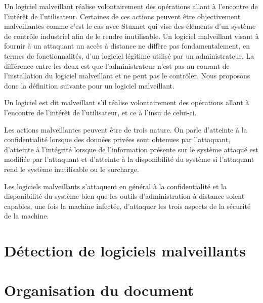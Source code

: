 
Un logiciel malveillant réalise volontairement des opérations allant à l'encontre de l'intérêt de l'utilisateur. 
Certaines de ces actions peuvent être objectivement malveillantes comme c'est le cas avec Stuxnet qui vise des éléments d'un système de contrôle industriel afin de le rendre inutilisable. 
Un logiciel malveillant visant à fournir à un attaquant un accès à distance ne diffère pas fondamentalement, en termes de fonctionnalités, d'un logiciel légitime utilisé par un administrateur.
La différence entre les deux est que l'administrateur n'est pas au courant de l'installation du logiciel malveillant et ne peut pas le contrôler.
Nous proposons donc la définition suivante pour un logiciel malveillant.
\begin{defi}
Un logiciel est dit malveillant s'il réalise volontairement des opérations allant à l'encontre de l'intérêt de l'utilisateur, et ce à l'insu de celui-ci.
\end{defi}

Les actions malveillantes peuvent être de trois nature. On parle d'atteinte à la confidentialité lorsque des données privées sont obtenues par l'attaquant, d'atteinte à l'intégrité lorsque de l'information présente sur le système attaqué est modifiée par l'attaquant et d'atteinte à la disponibilité du système si l'attaquant rend le système inutilisable ou le surcharge.

Les logiciels malveillants s'attaquent en général à la confidentialité et la disponibilité du système bien que les outils d'administration à distance soient capables, une fois la machine infectée, d'attaquer les trois aspects de la sécurité de la machine.




\section{Détection de logiciels malveillants}

\section{Organisation du document}